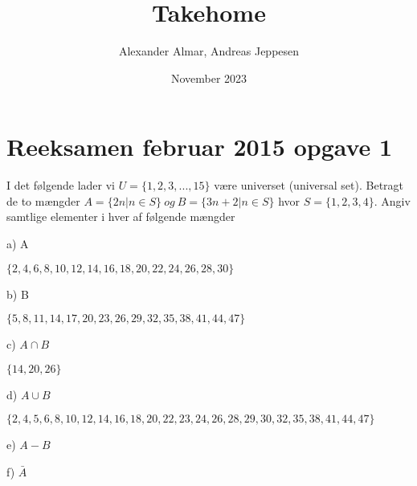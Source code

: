 \documentclass{article}
\title{Takehome}
\author{Alexander Almar, Andreas Jeppesen }
\date{November 2023}
\begin{document}
\maketitle

\section{Reeksamen februar 2015 opgave 1}
I det følgende lader vi \(U = \{1, 2, 3, . . . , 15\}\) være universet (universal set). Betragt de to mængder 
\(A = \{2n | n \in S\}\ og\ B = \{3n + 2 | n \in S\}\) hvor \(S = \{1, 2, 3, 4\}\). Angiv samtlige elementer i hver af følgende mængder

a) A

\(\{2,4,6,8,10,12,14,16,18,20,22,24,26,28,30\}\)

b) B

\(\{5,8,11,14,17,20,23,26,29,32,35,38,41,44,47\}\)

c) \(A \cap B\)

\(\{14,20,26\}\)

d) \(A \cup B\)

\(\{2,4,5,6,8,10,12,14,16,18,20,22,23,24,26,28,29,30,32,35,38,41,44,47\}\)

e) \(A-B\)

f) \(\bar A \)
\end{document}
